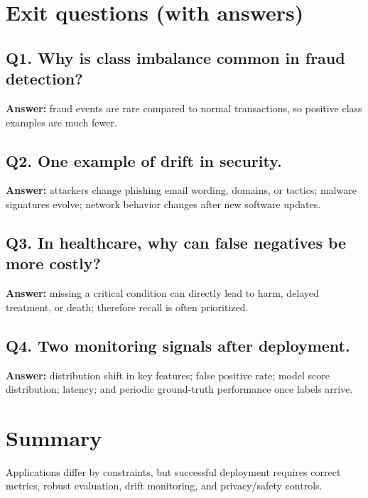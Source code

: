 \documentclass[11pt]{article}
\begin{document}
\section{Exit questions (with answers)}

\subsection*{Q1. Why is class imbalance common in fraud detection?}
\textbf{Answer:} fraud events are rare compared to normal transactions, so positive class examples are much fewer.

\subsection*{Q2. One example of drift in security.}
\textbf{Answer:} attackers change phishing email wording, domains, or tactics; malware signatures evolve; network behavior changes after new software updates.

\subsection*{Q3. In healthcare, why can false negatives be more costly?}
\textbf{Answer:} missing a critical condition can directly lead to harm, delayed treatment, or death; therefore recall is often prioritized.

\subsection*{Q4. Two monitoring signals after deployment.}
\textbf{Answer:} distribution shift in key features; false positive rate; model score distribution; latency; and periodic ground-truth performance once labels arrive.

\section{Summary}
Applications differ by constraints, but successful deployment requires correct metrics, robust evaluation, drift monitoring, and privacy/safety controls.
\notesources{\AIMLUnitVSources}
\end{document}
